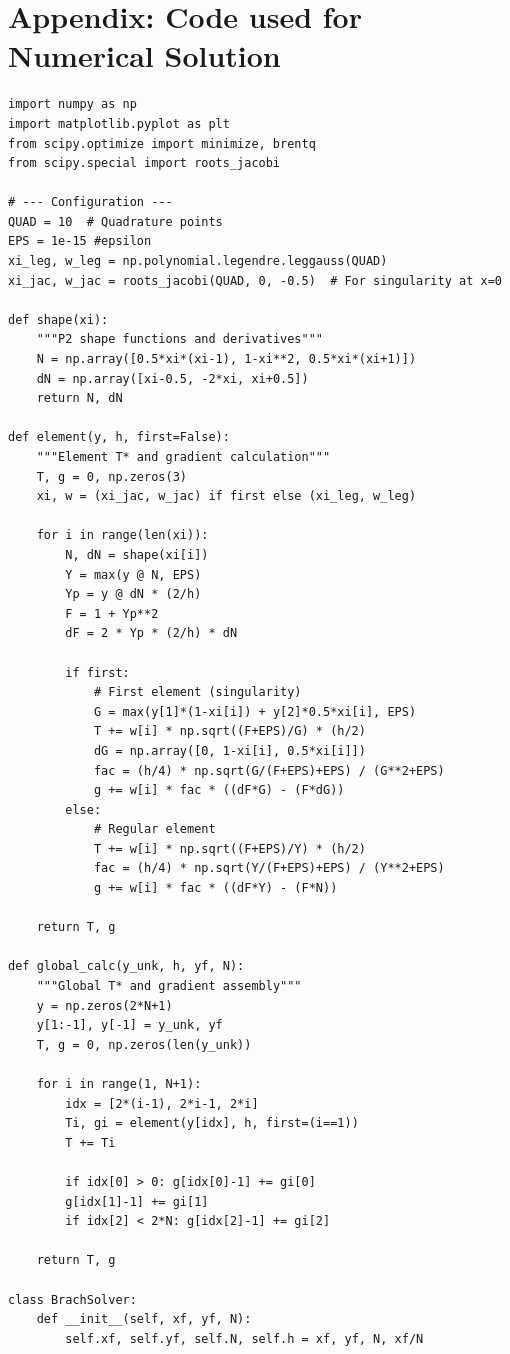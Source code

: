 \documentclass[11pt]{article}
\begin{document}
\section*{Appendix: Code used for Numerical Solution}
\label{app:appendix}
\fontsize{9}{9}\selectfont
\begin{verbatim}
import numpy as np
import matplotlib.pyplot as plt
from scipy.optimize import minimize, brentq
from scipy.special import roots_jacobi

# --- Configuration ---
QUAD = 10  # Quadrature points
EPS = 1e-15 #epsilon
xi_leg, w_leg = np.polynomial.legendre.leggauss(QUAD)
xi_jac, w_jac = roots_jacobi(QUAD, 0, -0.5)  # For singularity at x=0

def shape(xi):
    """P2 shape functions and derivatives"""
    N = np.array([0.5*xi*(xi-1), 1-xi**2, 0.5*xi*(xi+1)])
    dN = np.array([xi-0.5, -2*xi, xi+0.5])
    return N, dN

def element(y, h, first=False):
    """Element T* and gradient calculation"""
    T, g = 0, np.zeros(3)
    xi, w = (xi_jac, w_jac) if first else (xi_leg, w_leg)

    for i in range(len(xi)):
        N, dN = shape(xi[i])
        Y = max(y @ N, EPS)
        Yp = y @ dN * (2/h)
        F = 1 + Yp**2
        dF = 2 * Yp * (2/h) * dN

        if first:
            # First element (singularity)
            G = max(y[1]*(1-xi[i]) + y[2]*0.5*xi[i], EPS)
            T += w[i] * np.sqrt((F+EPS)/G) * (h/2)
            dG = np.array([0, 1-xi[i], 0.5*xi[i]])
            fac = (h/4) * np.sqrt(G/(F+EPS)+EPS) / (G**2+EPS)
            g += w[i] * fac * ((dF*G) - (F*dG))
        else:
            # Regular element
            T += w[i] * np.sqrt((F+EPS)/Y) * (h/2)
            fac = (h/4) * np.sqrt(Y/(F+EPS)+EPS) / (Y**2+EPS)
            g += w[i] * fac * ((dF*Y) - (F*N))

    return T, g

def global_calc(y_unk, h, yf, N):
    """Global T* and gradient assembly"""
    y = np.zeros(2*N+1)
    y[1:-1], y[-1] = y_unk, yf
    T, g = 0, np.zeros(len(y_unk))
    
    for i in range(1, N+1):
        idx = [2*(i-1), 2*i-1, 2*i]
        Ti, gi = element(y[idx], h, first=(i==1))
        T += Ti

        if idx[0] > 0: g[idx[0]-1] += gi[0]
        g[idx[1]-1] += gi[1]
        if idx[2] < 2*N: g[idx[2]-1] += gi[2]

    return T, g

class BrachSolver:
    def __init__(self, xf, yf, N):
        self.xf, self.yf, self.N, self.h = xf, yf, N, xf/N


\end{verbatim}
\end{document}
